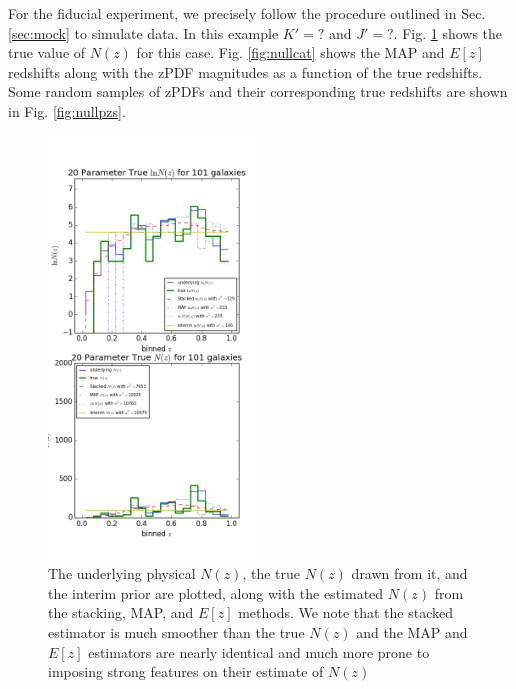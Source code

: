 \documentclass[preprint]{aastex}
\begin{document}
For the fiducial experiment, we precisely follow the procedure outlined in Sec. 
\ref{sec:mock} to simulate data.  In this example $K'=?$ and $J'=?$.  Fig. 
\ref{fig:nulltrueNz} shows the true value of $N(z)$ for this case.  Fig. 
\ref{fig:nullcat} shows the MAP and $E[z]$ redshifts along with the zPDF 
magnitudes as a function of the true redshifts.  Some random samples of zPDFs 
and their corresponding true redshifts are shown in Fig. \ref{fig:nullpzs}.

\begin{figure}
\includegraphics[width=0.5\textwidth]{null/trueNz.png}
\caption{The underlying physical $N(z)$, the true $N(z)$ drawn from it, and the 
interim prior are plotted, along with the estimated $N(z)$ from the stacking, 
MAP, and $E[z]$ methods.  We note that the stacked estimator is much smoother 
than the true $N(z)$ and the MAP and $E[z]$ estimators are nearly identical and 
much more prone to imposing strong features on their estimate of $N(z)$}
\label{fig:nulltrueNz}
\end{figure}
\end{document}
